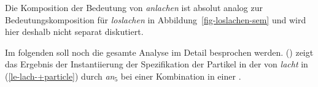 Die Komposition der Bedeutung von \emph{anlachen} ist absolut analog zur Bedeutungskomposition
für \emph{loslachen} in Abbildung~\vref{fig-loslachen-sem} und wird hier deshalb nicht separat diskutiert.


Im folgenden soll noch die gesamte Analyse im Detail besprochen werden. () zeigt das Ergebnis
der Instantiierung der Spezifikation der Partikel in der \subcatl
von \emph{lacht} in (\ref{le-lach-+particle}) durch \emph{an}$_5$ bei einer Kombination in einer
.
\newsavebox{\boxxcompdrei}
